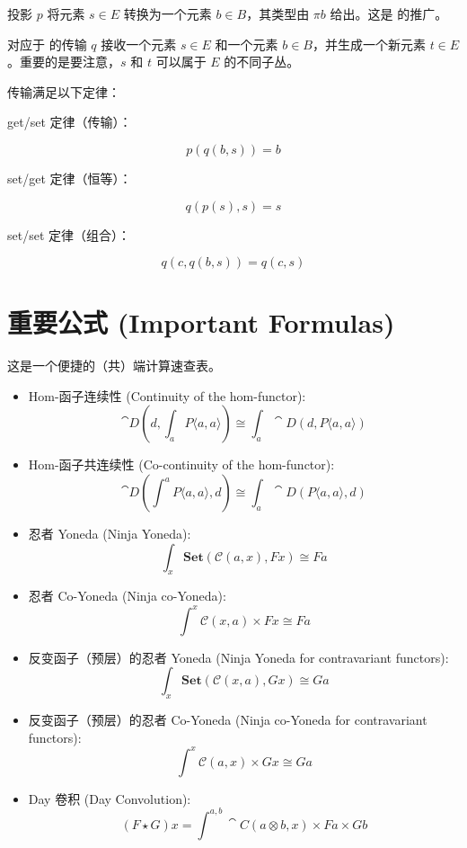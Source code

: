 \documentclass[DaoFP]{subfiles}
\begin{document}
 投影 $p$ 将元素 $s \in E$ 转换为一个元素 $b \in B$，其类型由 $\pi b$ 给出。这是  的推广。

 对应于  的传输 $q$ 接收一个元素 $s \in E$ 和一个元素 $b \in B$，并生成一个新元素 $t \in E$。重要的是要注意，$s$ 和 $t$ 可以属于 $E$ 的不同子丛。

 传输满足以下定律：

 get/set 定律（传输）：

 \[ p (q (b, s)) = b \]

 set/get 定律（恒等）：

 \[ q ( p (s), s) = s \]

 set/set 定律（组合）：

 \[ q (c, q (b, s)) = q (c, s) \]

 \section{重要公式 (Important Formulas)}
 这是一个便捷的（共）端计算速查表。
 \begin{itemize}
  \item Hom-函子连续性 (Continuity of the hom-functor):
  \[\cat D\left(d, \int_a P\langle a, a \rangle \right) \cong \int_a \cat D \left(d, P\langle a, a \rangle \right) \]
  \item Hom-函子共连续性 (Co-continuity of the hom-functor):
  \[\cat D\left( \int^a P\langle a, a \rangle , d \right) \cong \int_a \cat D \left( P\langle a, a \rangle, d \right) \]
  \item 忍者 Yoneda (Ninja Yoneda):
  \[ \int_{x} \mathbf{Set} (\mathcal{C}(a, x), F x) \cong F a \]
  \item 忍者 Co-Yoneda (Ninja co-Yoneda):
  \[ \int^{x} \mathcal{C}(x, a) \times F x \cong F a \]
  \item 反变函子（预层）的忍者 Yoneda (Ninja Yoneda for contravariant functors):
  \[ \int_{x} \mathbf{Set} (\mathcal{C}(x, a), G x) \cong G a \]
  \item 反变函子（预层）的忍者 Co-Yoneda (Ninja co-Yoneda for contravariant functors):
  \[ \int^{x} \mathcal{C}(a, x) \times G x \cong G a \]
  \item Day 卷积 (Day Convolution):
  \[ (F \star G) x = \int^{a, b} \cat C (a \otimes b, x) \times F a \times G b \]

 \end{itemize}
\end{document}
